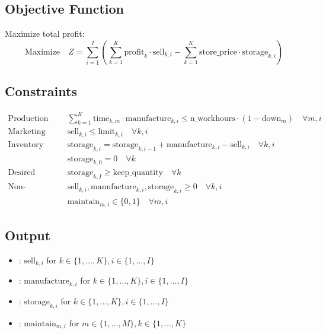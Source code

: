 \documentclass{article}
\begin{document}
\subsection*{Objective Function}
Maximize total profit:
\[
\text{Maximize} \quad Z = \sum_{i=1}^{I} \left( \sum_{k=1}^{K} \text{profit}_{k} \cdot \text{sell}_{k, i} - \sum_{k=1}^{K} \text{store\_price} \cdot \text{storage}_{k, i} \right)
\]

\subsection*{Constraints}
\begin{align*}
\text{Production Time Constraint:} & \quad \sum_{k=1}^{K} \text{time}_{k, m} \cdot \text{manufacture}_{k, i} \leq \text{n\_workhours} \cdot (1 - \text{down}_{m}) \quad \forall m, i\\
\text{Marketing Limitations:} & \quad \text{sell}_{k, i} \leq \text{limit}_{k, i} \quad \forall k, i\\
\text{Inventory Balance:} & \quad \text{storage}_{k, i} = \text{storage}_{k, i-1} + \text{manufacture}_{k, i} - \text{sell}_{k, i} \quad \forall k, i\\
& \quad \text{storage}_{k, 0} = 0 \quad \forall k \\
\text{Desired Ending Inventory:} & \quad \text{storage}_{k, I} \geq \text{keep\_quantity} \quad \forall k\\
\text{Non-negativity Constraints:} & \quad \text{sell}_{k, i}, \text{manufacture}_{k, i}, \text{storage}_{k, i} \geq 0 \quad \forall k, i\\
& \quad \text{maintain}_{m, i} \in \{0, 1\} \quad \forall m, i
\end{align*}

\subsection*{Output}
\begin{itemize}
    \item {}: \( \text{sell}_{k, i} \) for \( k \in \{1,\ldots,K\}, i \in \{1,\ldots,I\} \)
    \item {}: \( \text{manufacture}_{k, i} \) for \( k \in \{1,\ldots,K\}, i \in \{1,\ldots,I\} \)
    \item {}: \( \text{storage}_{k, i} \) for \( k \in \{1,\ldots,K\}, i \in \{1,\ldots,I\} \)
    \item {}: \( \text{maintain}_{m, i} \) for \( m \in \{1,\ldots,M\}, k \in \{1,\ldots,K\} \)
\end{itemize}
\end{document}
